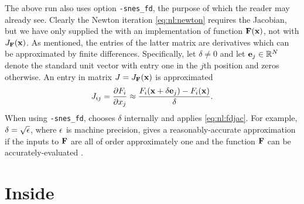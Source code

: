 The above run also uses option \texttt{-snes\_fd}, the purpose of which the reader may already see.  Clearly the Newton iteration \eqref{eq:nl:newton} requires the Jacobian, but we have only supplied the \pSNES with an implementation of function $\mathbf{F}(\mathbf{x})$, not with $J_{\mathbf{F}}(\mathbf{x})$.  As mentioned, the entries of the latter matrix are derivatives which can be approximated by finite differences.  Specifically, let $\delta\ne 0$ and let $\mathbf{e}_j\in \mathbb{R}^N$ denote the standard unit vector with entry one in the $j$th position and zeros otherwise.  An entry in matrix $J=J_{\mathbf{F}}(\mathbf{x})$ is approximated
\begin{equation}
J_{ij} = \frac{\partial F_i}{\partial x_j} \approx \frac{F_i(\mathbf{x}+\delta \mathbf{e}_j) - F_i(\mathbf{x})}{\delta}.  \label{eq:nl:fdjac}
\end{equation}
When using \texttt{-snes\_fd}, \PETSc chooses $\delta$ internally and applies \eqref{eq:nl:fdjac}.  For example, $\delta = \sqrt{\epsilon}$, where $\epsilon$ is machine precision, gives a reasonably-accurate approximation if the inputs to $\mathbf{F}$ are all of order approximately one and the function $\mathbf{F}$ can be accurately-evaluated \citep{Kelley2003}.


\section{Inside \pSNES} \label{sec:insidesnes}

